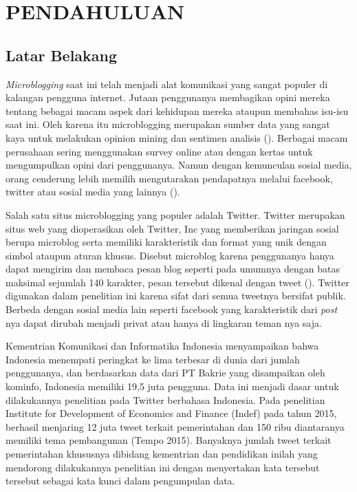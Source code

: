 \section*{PENDAHULUAN} %
\subsection*{Latar Belakang}

\textit{Microblogging} saat ini telah menjadi alat komunikasi yang sangat populer di kalangan pengguna internet. Jutaan penggunanya membagikan opini mereka tentang bebagai macam aspek dari kehidupan mereka ataupun membahas isu-isu saat ini. Oleh karena itu microblogging merupakan sumber data yang sangat kaya untuk melakukan opinion mining dan sentimen analisis \citeauthor{PAK10.385} (\cite*{PAK10.385}). Berbagai macam perusahaan sering menggunakan survey online atau dengan kertas untuk mengumpulkan opini dari penggunanya. Namun dengan kemunculan sosial media, orang cenderung lebih memilih mengutarakan pendapatnya melalui facebook, twitter atau sosial media yang lainnya (\cite{AnwarHridoy2015}).

Salah satu situs microblogging yang populer adalah Twitter. Twitter merupakan situs web yang dioperasikan oleh Twitter, Inc yang memberikan jaringan sosial berupa microblog serta memiliki karakteristik dan format yang unik dengan simbol ataupun aturan khusus. Disebut microblog karena penggunanya hanya dapat mengirim dan membaca pesan blog seperti pada umumnya dengan batas maksimal sejumlah 140 karakter, pesan tersebut dikenal dengan tweet (\cite{ZHANG2011}). Twitter digunakan dalam penelitian ini karena sifat dari semua tweetnya bersifat publik. Berbeda dengan sosial media lain seperti facebook yang karakteristik dari \textit{post} nya dapat dirubah menjadi privat atau hanya di lingkaran teman nya saja.

Kementrian Komunikasi dan Informatika Indonesia menyampaikan bahwa Indonesia menempati peringkat ke lima terbesar di dunia dari jumlah penggunanya, dan berdasarkan data dari PT Bakrie yang disampaikan oleh kominfo, Indonesia memiliki 19,5 juta pengguna. Data ini menjadi dasar untuk dilakukannya penelitian pada Twitter berbahasa Indonesia. Pada penelitian Institute for Development of Economics and Finance (Indef) pada tahun 2015, berhasil menjaring 12 juta tweet terkait pemerintahan dan 150 ribu diantaranya memiliki tema pembangunan (Tempo 2015). Banyaknya jumlah tweet terkait pemerintahan khususnya dibidang kementrian dan pendidikan inilah yang mendorong dilakukannya penelitian ini dengan menyertakan kata tersebut tersebut sebagai kata kunci dalam pengumpulan data.

